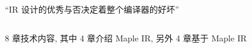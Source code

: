 


\begin{frame}{}
	\begin{center}
		``IR 设计的优秀与否决定着整个编译器的好坏''
	\end{center}

	\begin{columns}
	\end{columns}

	\vspace{0.50cm}
	\begin{center}
		8 章技术内容, 其中 4 章介绍 Maple IR, 另外 4 章基于 Maple IR
	\end{center}
\end{frame}
